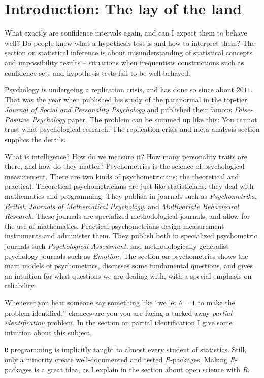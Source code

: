 \section{Introduction: The lay of the land}

What exactly are confidence intervals again, and can I expect them to behave well? Do people know what a hypothesis test is and how to interpret them? The section on statistical inference is about misunderstanding of statistical concepts and impossibility results -- situations when frequentists constructions such as confidence sets and hypothesis tests fail to be well-behaved. 

Psychology is undergoing a replication crisis, and has done so since about $2011$. That was the year when \textcite{Bem2011-vq} published his study of the paranormal in the top-tier \textit{Journal of Social and Personality Psychology} and \textcite{simmons_false-positive_2011} published their famous \textit{False-Positive Psychology} paper. The problem can be summed up like this: You cannot trust what psychological research. The replication crisis and meta-analysis section supplies the details.

What is intelligence? How do we measure it? How many personality traits are there, and how do they matter? Psychometrics is the science of psychological measurement. There are two kinds of psychometricians; the theoretical and practical. Theoretical psychometricians are just like statisticians, they deal with mathematics and programming. They publish in journals such as \textit{Psychometrika}, \textit{British Journals of Mathematical Psychology}, and \textit{Multivariate Behavioural Research}. These journals are specialized methodological journals, and allow for the use of mathematics. Practical psychometrians design measurement instruments and administer them. They publish both in specialized psychometric journals such \textit{Psychological Assessment}, and methodologically generalist psychology journals such as \textit{Emotion.} The section on psychometrics shows the main models of psychometrics, discusses some fundamental questions, and gives an intuition for what questions we are dealing with, with a special emphasis on reliability.

Whenever you hear someone say something like ``we let $\theta=1$ to make the problem identified,'' chances are you you are facing a tucked-away \textit{partial identification} problem. In the section on partial identification I give some intuition about this subject.

\texttt{R} programming is implicitly taught to almost every student of statistics. Still, only a minority create well-documented and tested \textit{R}-packages. Making \textit{R}-packages is a great idea, as I explain in the section about open science with \textit{R}.